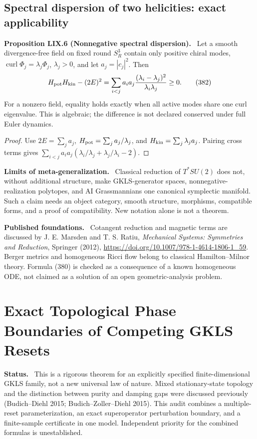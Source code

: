 \documentclass[11pt,a4paper,oneside]{book}
\newcommand{\statement}[3]{\par\medskip\noindent\textbf{#1 #2 (#3).}\ }
\newcommand{\note}[1]{\par\medskip\noindent\textbf{#1}\ }
\begin{document}
\section{Spectral dispersion of two helicities: exact applicability}
\statement{Proposition}{LIX.6}{Nonnegative spectral dispersion}
Let a smooth divergence-free field on fixed round $S_R^3$ contain only positive chiral modes, $\operatorname{curl}\Phi_j=\lambda_j\Phi_j$, $\lambda_j>0$, and let $a_j=|c_j|^2$. Then
\begin{equation}H_{\rm pot}H_{\rm kin}-(2E)^2=\sum_{i<j}a_ia_j\frac{(\lambda_i-\lambda_j)^2}{\lambda_i\lambda_j}\ge0.\tag{382}\end{equation}
For a nonzero field, equality holds exactly when all active modes share one curl eigenvalue. This is algebraic; the difference is not declared conserved under full Euler dynamics.
\begin{proof}
Use $2E=\sum_ja_j$, $H_{\rm pot}=\sum_ja_j/\lambda_j$, and $H_{\rm kin}=\sum_j\lambda_ja_j$. Pairing cross terms gives $\sum_{i<j}a_ia_j(\lambda_i/\lambda_j+\lambda_j/\lambda_i-2)$.
\end{proof}
\note{Limits of meta-generalization.} Classical reduction of $T^*SU(2)$ does not, without additional structure, make GKLS-generator spaces, nonnegative-realization polytopes, and AI Grassmannians one canonical symplectic manifold. Such a claim needs an object category, smooth structure, morphisms, compatible forms, and a proof of compatibility. New notation alone is not a theorem.

\note{Published foundations.} Cotangent reduction and magnetic terms are discussed by J. E. Marsden and T. S. Ratiu, \emph{Mechanical Systems: Symmetries and Reduction}, Springer (2012), \url{https://doi.org/10.1007/978-1-4614-1806-1_59}. Berger metrics and homogeneous Ricci flow belong to classical Hamilton--Milnor theory. Formula (380) is checked as a consequence of a known homogeneous ODE, not claimed as a solution of an open geometric-analysis problem.
\setcounter{equation}{382}


\chapter{Exact Topological Phase Boundaries of Competing GKLS Resets}
\note{Status.} This is a rigorous theorem for an explicitly specified finite-dimensional GKLS family, not a new universal law of nature. Mixed stationary-state topology and the distinction between purity and damping gaps were discussed previously (Budich--Diehl 2015; Budich--Zoller--Diehl 2015). This audit combines a multiple-reset parameterization, an exact superoperator perturbation boundary, and a finite-sample certificate in one model. Independent priority for the combined formulas is unestablished.
\end{document}
